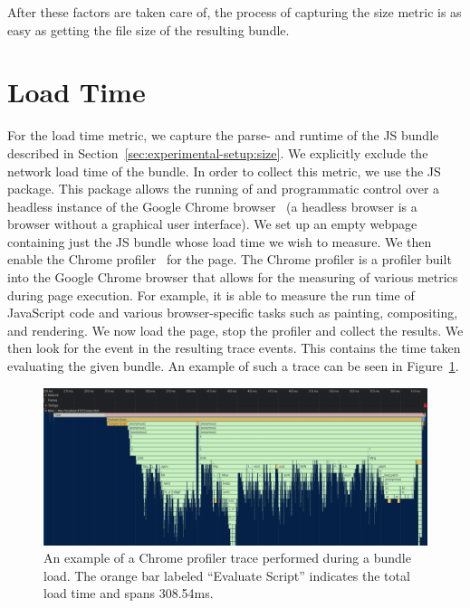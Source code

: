 After these factors are taken care of, the process of capturing the size metric is as easy as getting the file size of the resulting bundle.

\section{Load Time}\label{sec:experimental-setup:load-time}
For the load time metric, we capture the parse- and runtime of the JS bundle described in Section~\ref{sec:experimental-setup:size}. We explicitly exclude the network load time of the bundle. In order to collect this metric, we use the  JS package. This package allows the running of and programmatic control over a headless instance of the Google Chrome browser~ (a headless browser is a browser without a graphical user interface). We set up an empty webpage containing just the JS bundle whose load time we wish to measure. We then enable the Chrome profiler~ for the page. The Chrome profiler is a profiler built into the Google Chrome browser that allows for the measuring of various metrics during page execution. For example, it is able to measure the run time of JavaScript code and various browser-specific tasks such as painting, compositing, and rendering. We now load the page, stop the profiler and collect the results. We then look for the  event in the resulting trace events. This contains the time taken evaluating the given bundle. An example of such a trace can be seen in Figure~\ref{fig:experimental-setup:load-time}.

\begin{figure}[h]
  \includegraphics[width=\columnwidth]{figures/experimental-setup/load-time.png}
  \caption{An example of a Chrome profiler trace performed during a bundle load. The orange bar labeled ``Evaluate Script'' indicates the total load time and spans 308.54ms.}
  \label{fig:experimental-setup:load-time}
  \centering
\end{figure}

